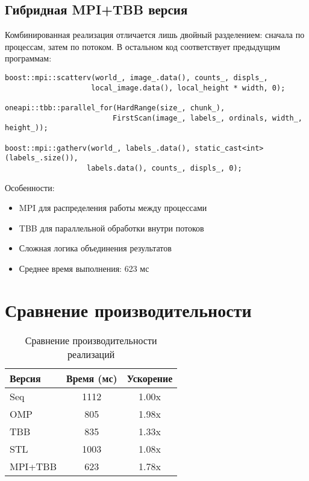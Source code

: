\documentclass[a4paper,14pt]{article}
\begin{document}
\subsection{Гибридная MPI+TBB версия}
Комбинированная реализация отличается лишь двойный разделением: сначала по процессам, затем по потоком. В остальном код соответствует предыдущим программам: 

\begin{lstlisting}[caption=Ключевые компоненты MPI+TBB]
boost::mpi::scatterv(world_, image_.data(), counts_, displs_, 
                    local_image.data(), local_height * width, 0);

oneapi::tbb::parallel_for(HardRange(size_, chunk_), 
                         FirstScan(image_, labels_, ordinals, width_, height_));

boost::mpi::gatherv(world_, labels_.data(), static_cast<int>(labels_.size()),
                   labels.data(), counts_, displs_, 0);
\end{lstlisting}

Особенности:
\begin{itemize}
    \item MPI для распределения работы между процессами
    \item TBB для параллельной обработки внутри потоков
    \item Сложная логика объединения результатов
    \item Среднее время выполнения: 623 мс
\end{itemize}

\section{Сравнение производительности}

\begin{table}[h]
\centering
\caption{Сравнение производительности реализаций}
\label{tab:performance}
\begin{tabular}{lcc}
\toprule
Версия & Время (мс) & Ускорение \\
\midrule
Seq & 1112 & 1.00x \\
OMP & 805 & 1.98x \\
TBB & 835 & 1.33x \\
STL & 1003 & 1.08x \\
MPI+TBB & 623 & 1.78x \\
\bottomrule
\end{tabular}
\end{table}
\end{document}
